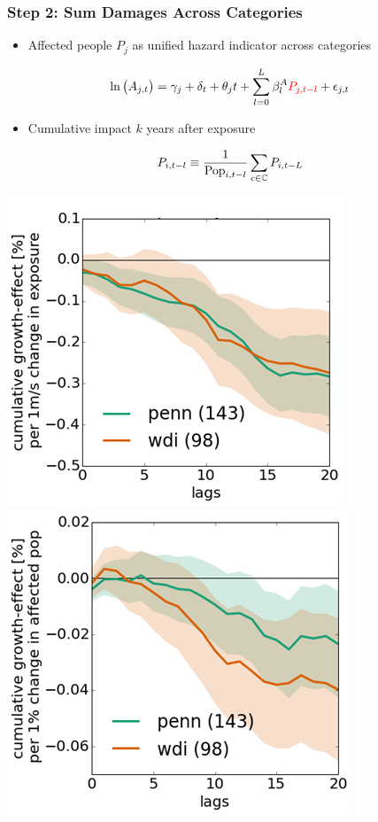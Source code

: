 \documentclass[
c,
11pt,
aspectratio=169, %
final,
]{beamer}
\begin{document}
\begin{frame}
  \frametitle{Step 2: Sum Damages Across Categories}
  \begin{minipage}[t]{.6\linewidth}
    \vspace{0pt}
  \begin{itemize}
  \item Affected people $P_j$ as unified hazard indicator across categories
  \end{itemize}
  \begin{equation*}
    \ln\big(A_{j,t}\big) = \gamma_j + \delta_{t} + \theta_j t + \sum_{l=0}^{L}\bA_{l}\tc{red}{P_{j,t-l}}+\epsilon_{j,t}
  \end{equation*}
  \begin{itemize}
  \item Cumulative impact $k$ years after exposure
  \end{itemize}
  \begin{equation*}
    P_{i,t-l}\equiv\frac{1}{\operatorname{Pop}_{i,t-l}}\sum_{c\in\mbC} P_{i,t-L}
  \end{equation*}
\end{minipage}\hfill
\begin{minipage}[t]{.39\linewidth}  
  \vspace{-30pt}
  \raggedleft
  \centering
  \includegraphics[width=.6\textwidth]{figures/ind_windspeed}
  \vfill
  \raggedleft
  \centering
  \includegraphics[width=.6\textwidth]{figures/ind_affected_people}
\end{minipage}
\end{frame}
\end{document}

